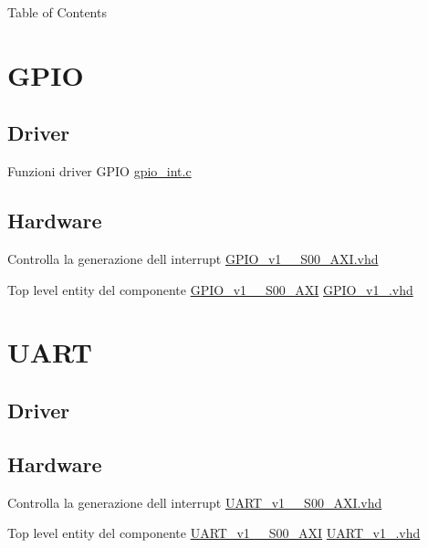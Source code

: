 \begin{DoxyParagraph}{Table of Contents}

\end{DoxyParagraph}
\hypertarget{index_GPIO}{}\section{G\+P\+IO}\label{index_GPIO}
\hypertarget{index_Driver}{}\subsection{Driver}\label{index_Driver}

\begin{DoxyItemize}
\item Funzioni driver G\+P\+IO \hyperlink{gpio__int_8c}{gpio\+\_\+int.\+c} 
\end{DoxyItemize}\hypertarget{index_Hardware}{}\subsection{Hardware}\label{index_Hardware}

\begin{DoxyItemize}
\item Controlla la generazione dell\textquotesingle{} interrupt \hyperlink{GPIO__v1__0__S00__AXI_8vhd}{G\+P\+I\+O\+\_\+v1\+\_\+\_\+\+S00\+\_\+\+A\+X\+I.\+vhd}
\item Top level entity del componente \hyperlink{classGPIO__v1__0__S00__AXI}{G\+P\+I\+O\+\_\+v1\+\_\+\_\+\+S00\+\_\+\+A\+XI} \hyperlink{GPIO__v1__0_8vhd}{G\+P\+I\+O\+\_\+v1\+\_.\+vhd} 
\end{DoxyItemize}\hypertarget{index_UART}{}\section{U\+A\+RT}\label{index_UART}
\hypertarget{index_Driver}{}\subsection{Driver}\label{index_Driver}
\hypertarget{index_Hardware}{}\subsection{Hardware}\label{index_Hardware}

\begin{DoxyItemize}
\item Controlla la generazione dell\textquotesingle{} interrupt \hyperlink{UART__v1__0__S00__AXI_8vhd}{U\+A\+R\+T\+\_\+v1\+\_\+\_\+\+S00\+\_\+\+A\+X\+I.\+vhd}
\item Top level entity del componente \hyperlink{classUART__v1__0__S00__AXI}{U\+A\+R\+T\+\_\+v1\+\_\+\_\+\+S00\+\_\+\+A\+XI} \hyperlink{UART__v1__0_8vhd}{U\+A\+R\+T\+\_\+v1\+\_.\+vhd} 
\end{DoxyItemize}